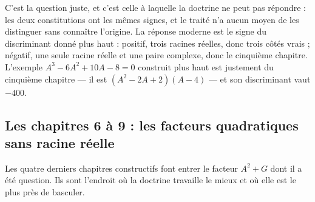 \documentclass[11pt,a4paper]{article}
\begin{document}
C'est la question juste, et c'est celle à laquelle la doctrine ne peut pas
répondre : les deux constitutions ont les mêmes signes, et le traité n'a aucun
moyen de les distinguer sans connaître l'origine. La réponse moderne est le
signe du discriminant donné plus haut : positif, trois racines réelles, donc
trois côtés vrais ; négatif, une seule racine réelle et une paire complexe, donc
le cinquième chapitre. L'exemple $A^3 - 6A^2 + 10A - 8 = 0$ construit plus haut
est justement du cinquième chapitre — il est
$(A^2 - 2A + 2)(A - 4)$ — et son discriminant vaut $-400$.

\subsection*{Les chapitres 6 à 9 : les facteurs quadratiques sans racine réelle}

Les quatre derniers chapitres constructifs font entrer le facteur $A^2 + G$ dont
il a été question. Ils sont l'endroit où la doctrine travaille le mieux et où
elle est le plus près de basculer.
\end{document}

